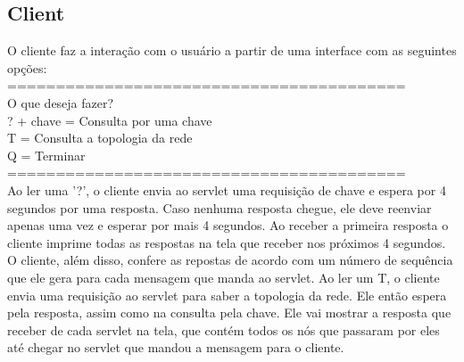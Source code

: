 \documentclass[10pt]{article}
\begin{document}
		\subsection{Client}
			O cliente faz a interação com o usuário a partir de uma interface com as seguintes opções:\\
	=========================================\\
	O que deseja fazer?\\
	?  + chave = Consulta por uma chave\\
	T          = Consulta a topologia da rede\\
	Q          = Terminar\\
	=========================================\\
			Ao ler uma '?', o cliente envia ao servlet uma requisição de chave e espera por 4 segundos por uma resposta. Caso nenhuma resposta chegue, ele deve reenviar apenas uma vez e esperar por mais 4 segundos. Ao receber a primeira resposta o cliente imprime todas as respostas na tela que receber nos próximos 4 segundos.
			O cliente, além disso, confere as repostas de acordo com um número de sequência que ele gera para cada mensagem que manda ao servlet.
			\newline Ao ler um T, o cliente envia uma requisição ao servlet para saber a topologia da rede. Ele então espera pela resposta, assim como na consulta pela chave. Ele vai mostrar a resposta que receber de cada servlet na tela, que contém todos os nós que passaram por eles até chegar no servlet que mandou a mensagem para o cliente.
\end{document}
